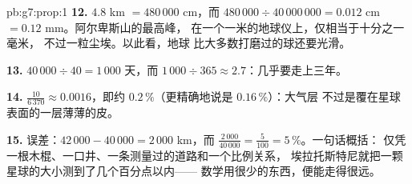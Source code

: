 \begin{solution}{pb:g7:prop:1}
\textbf{12.} $4.8$ km $= 480\,000$ cm，而
$480\,000 \div 40\,000\,000 = 0.012$ cm $= 0.12$ mm。阿尔卑斯山的最高峰，
在一个一米的地球仪上，仅相当于十分之一毫米，
不过一粒尘埃。以此看，地球
比大多数打磨过的球还要光滑。

\textbf{13.} $40\,000 \div 40 = 1\,000$ 天，而
$1\,000 \div 365 \approx 2.7$：几乎要走上三年。

\textbf{14.} $\frac{10}{6\,370} \approx 0.0016$，即约
$0.2\,\%$（更精确地说是 $0.16\,\%$）：大气层
不过是覆在星球表面的一层薄薄的皮。

\textbf{15.} 误差：$42\,000 - 40\,000 = 2\,000$ km，而
$\frac{2\,000}{40\,000} = \frac{5}{100} = 5\,\%$。一句话概括：
仅凭一根木棍、一口井、一条测量过的道路和一个比例关系，
埃拉托斯特尼就把一颗星球的大小测到了几个百分点以内——
数学用很少的东西，便能走得很远。
\end{solution}
